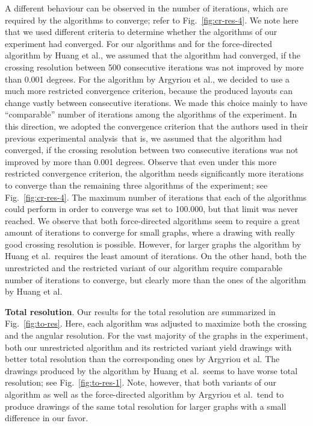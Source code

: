 \documentclass[runningheads]{llncs}
\newcommand{\myparagraph}[1]{\smallskip\noindent\textbf{#1}.}
\begin{document}
A different behaviour can be observed in the number of iterations, which are required by the algorithms to converge; refer to Fig.~\ref{fig:cr-res-4}. We note here that we used different criteria to determine whether the algorithms of our experiment had converged. For our algorithms and for the force-directed algorithm by Huang et al., we assumed that the algorithm had converged, if the crossing resolution between 500 consecutive iterations was not improved by more than 0.001 degrees. For the algorithm by Argyriou et al., we decided to use a much more restricted convergence criterion, because the produced layouts can change vastly between  consecutive iterations. We made this choice mainly to have ``comparable'' number of iterations among the algorithms of the experiment. In this direction, we adopted the convergence criterion that the authors used in their previous experimental analysis\, that is, we assumed that the algorithm had converged, if the crossing resolution between two consecutive iterations was not improved by more than 0.001 degrees. Observe that even under this more restricted convergence criterion, the algorithm needs significantly more iterations to converge than the remaining three algorithms of the experiment; see Fig.~\ref{fig:cr-res-4}. The maximum number of iterations that each of the algorithms could perform in order to converge was set to 100.000, but that limit was never reached. We observe that both force-directed algorithms seem to require a great amount of iterations to converge for small graphs, where a drawing with really good crossing resolution is possible. However, for larger graphs  the algorithm by Huang et al.\ requires the least amount of iterations. On the other hand, both the unrestricted and the restricted variant of our algorithm require comparable number of iterations to converge, but clearly more than the ones of the algorithm by Huang et al.

\myparagraph{Total resolution} Our results for the total resolution are summarized in Fig.~\ref{fig:to-res}. Here, each algorithm was adjusted to maximize both the crossing and the angular resolution. For the vast majority of the graphs in the experiment, both our unrestricted algorithm and its restricted variant yield  drawings with better total resolution than the corresponding ones by Argyriou et al. The drawings produced by the algorithm by Huang et al.\ seems to have worse total resolution; see Fig.~\ref{fig:to-res-1}. Note, however, that both variants of our algorithm as well as the force-directed algorithm by Argyriou et al.\ tend to produce drawings of the same total resolution for larger graphs with a small difference in our favor.
\end{document}
